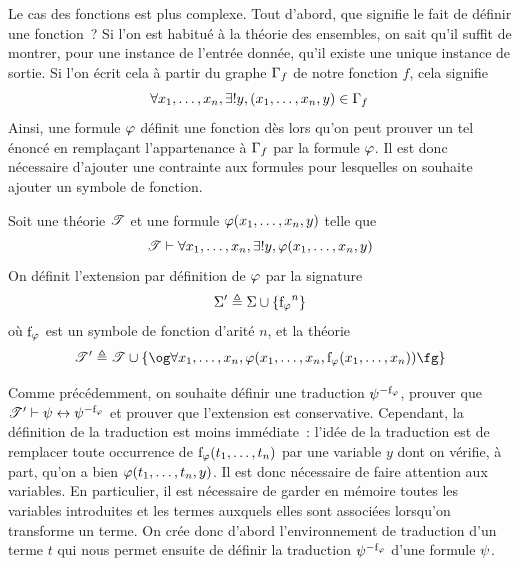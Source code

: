 Le cas des fonctions est plus complexe. Tout d'abord, que signifie le fait de
définir une fonction~? Si l'on est habitué à la théorie des ensembles, on sait
qu'il suffit de montrer, pour une instance de l'entrée donnée, qu'il existe une
unique instance de sortie. Si l'on écrit cela à partir du graphe $\Gamma_{f}$
de notre fonction $f$, cela signifie
\[\forall x_1,\ldots,x_n, \exists! y, (x_1,\ldots,x_n,y) \in \Gamma_{f}\]
Ainsi, une formule $\varphi$ définit une fonction dès lors qu'on peut prouver un
tel énoncé en remplaçant l'appartenance à $\Gamma_{f}$ par la formule
$\varphi$. Il est donc nécessaire d'ajouter une contrainte aux formules pour
lesquelles on souhaite ajouter un symbole de fonction.

\begin{definition}
  \label{def.ext.def.fun}
  Soit une théorie $\mathscr T$ et une formule $\varphi(x_1,\ldots,x_n,y)$ telle que
  \[\mathscr T \vdash \forall x_1,\ldots,x_n, \exists! y, \varphi(x_1,\ldots,x_n,y)\]
  On définit l'extension par définition de $\varphi$ par la signature
  \[\Sigma' \triangleq \Sigma \cup \{{\mathrm{f}_{\varphi}}^n\}\]
  où $\mathrm{f}_{\varphi}$ est un symbole de fonction d'arité $n$, et la théorie
  \[\varT' \defeq \varT \cup \\
  \{\ogM\forall x_1,\ldots,x_n,
  \varFF(x_1,\ldots,x_n,\symbFF(x_1,\ldots,x_n))\fgM\}
  \]
\end{definition}

Comme précédemment, on souhaite définir une traduction ${\psi}^{-\mathrm{f}_{\varphi}}$, prouver que
$\mathscr T' \vdash \psi \mathrel{\leftrightarrow} {\psi}^{-\mathrm{f}_{\varphi}}$ et prouver que l'extension est
conservative. Cependant, la définition de la traduction est moins immédiate~:
l'idée de la traduction est de remplacer toute occurrence de
$\mathrm{f}_{\varphi}(t_1,\ldots,t_n)$ par une
variable $y$ dont on vérifie, à part, qu'on a bien $\varphi(t_1,\ldots,t_n,y)$.
Il est donc nécessaire de faire attention aux variables. En particulier, il est
nécessaire de garder en mémoire toutes les variables introduites et les termes
auxquels elles sont associées lorsqu'on transforme un terme. On crée donc
d'abord l'environnement de traduction d'un terme $t$ qui nous permet ensuite de
définir la traduction ${\psi}^{-\mathrm{f}_{\varphi}}$ d'une formule $\psi$.

